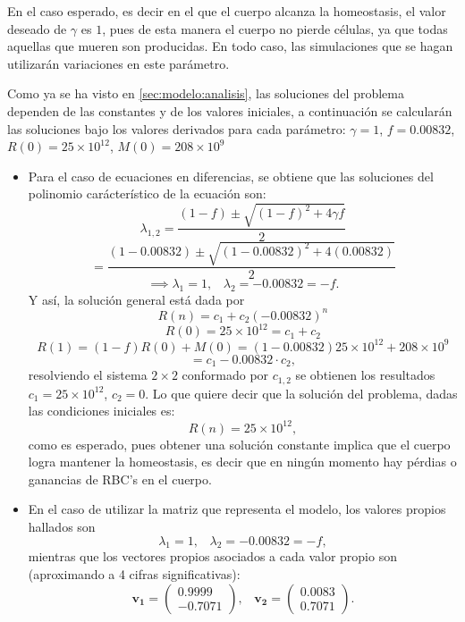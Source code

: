 En el caso esperado, es decir en el que el cuerpo alcanza la homeostasis, el valor deseado de $\gamma$ es $1$, pues de esta manera el cuerpo no pierde células, ya que todas aquellas que mueren son producidas. En todo caso, las simulaciones que se hagan utilizarán variaciones en este parámetro.

Como ya se ha visto en \ref{sec:modelo:analisis}, las soluciones del problema dependen de las constantes y de los valores iniciales, a continuación se calcularán las soluciones bajo los valores derivados para cada parámetro: $\gamma = 1$, $f = 0.00832$, $R(0)=25\times 10^{12}$, $M(0)=208\times 10^{9}$ 

\begin{itemize}
    \item Para el caso de ecuaciones en diferencias, se obtiene que las soluciones del polinomio carácterístico de la ecuación son:
        $$\lambda_{1,2}=\dfrac{(1-f)\pm\sqrt{(1-f)^2+4\gamma f}}{2}$$
        $$=\dfrac{(1-0.00832)\pm \sqrt{(1-0.00832)^2+4(0.00832)}}{2}$$
        $$\implies \lambda_1 = 1,\;\;\; \lambda_2 = -0.00832=-f.$$
        Y así, la solución general está dada por 
        $$R(n)=c_1+c_2(-0.00832)^n$$
        $$R(0)=25\times 10^{12}=c_1+c_2$$
        $$R(1)=(1-f)R(0)+M(0)=(1-0.00832)25 \times 10^{12}+208\times 10^9$$
        $$=c_1-0.00832\cdot c_2,$$
        resolviendo el sistema $2\times 2$ conformado por $c_{1,2}$ se obtienen los resultados $c_1=25\times 10^{12}$, $c_2 = 0$. Lo que quiere decir que la solución del problema, dadas las condiciones iniciales es:
        $$R(n)=25\times 10^{12},$$
        como es esperado, pues obtener una solución constante implica que el cuerpo logra mantener la homeostasis, es decir que en ningún momento hay pérdias o ganancias de RBC's en el cuerpo.
    \item En el caso de utilizar la matriz que representa el modelo, los valores propios hallados son
        $$\lambda_1 = 1, \;\;\; \lambda_2 = -0.00832=-f,$$
        mientras que los vectores propios asociados a cada valor propio son (aproximando a 4 cifras significativas):
        $$\mathbf{v_1}=\begin{pmatrix}
            0.9999  \\
            -0.7071
            \end{pmatrix},\;\;\;  \mathbf{v_2}=\begin{pmatrix}
            0.0083 \\
            0.7071
            \end{pmatrix}.$$

\end{itemize}

